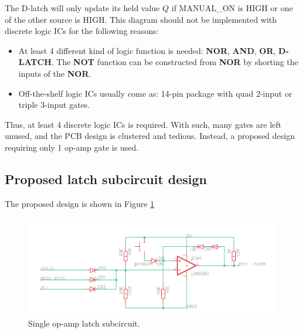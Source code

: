 \documentclass[../main.tex]{subfiles}
\begin{document}
    \justify
    The D-latch will only update its held value $Q$ if MANUAL\_ON is HIGH or one of the other source is HIGH. This diagram should not be implemented with discrete logic ICs for the following reasons:
    \begin{itemize}
        \item At least 4 different kind of logic function is needed: \textbf{NOR}, \textbf{AND}, \textbf{OR}, \textbf{D-LATCH}. The \textbf{NOT} function can be constructed from \textbf{NOR} by shorting the inputs of the \textbf{NOR}.
        \item Off-the-shelf logic ICs usually come as: 14-pin package with quad 2-input or triple 3-input gates.
    \end{itemize}

    \justify
    Thus, at least 4 discrete logic ICs is required. With such, many gates are left unused, and the PCB design is clustered and tedious. Instead, a proposed design requiring only 1 op-amp gate is used.

    \pagebreak
    \subsection{Proposed latch subcircuit design} \label{ssec:proposed_latch_design}
    The proposed design is shown in Figure \ref{fig:op_amp_latch_circuit}

    \begin{figure}[!h]
        \centerline{\includegraphics[width=\linewidth]{media/op_amp_latch_circuit.png}}
        \caption{Single op-amp latch subcircuit.}
        \label{fig:op_amp_latch_circuit}
    \end{figure} 
\end{document}
